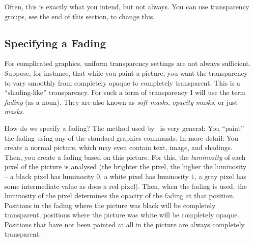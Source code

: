 \begin{codeexample}[]
\end{codeexample}

Often, this is exactly what you intend, but not always. You can use
transparency groups, see the end of this section, to change this.


\subsection{Specifying a Fading}


For complicated graphics, uniform transparency settings are not always
sufficient. Suppose, for instance, that while you paint a picture, you
want the transparency to vary smoothly from completely opaque to
completely transparent. This is a ``shading-like'' transparency. For
such a form of transparency I will use the term \emph{fading} (as a
noun). They are also known as \emph{soft masks}, \emph{opacity masks},
or just \emph{masks}.

How do we specify a fading? The method used by \pgfname\ is very
general: You ``paint'' the fading using any of the standard graphics
commands. In more detail: You create a normal picture, which may even
contain text, image, and shadings. Then, you create a fading based on
this picture. For this, the \emph{luminosity} of each pixel of the
picture is analysed (the brighter the pixel, the higher the luminosity
-- a black pixel has luminosity $0$, a white pixel has luminosity $1$,
a gray pixel has some intermediate value as does a red pixel). Then,
when the fading is used, the luminosity of the pixel determines the
opacity of the fading at that position. Positions in the fading where
the picture was black will be completely transparent, positions where
the picture was white will be completely opaque. Positions that have
not been painted at all in the picture are always completely
transparent.


